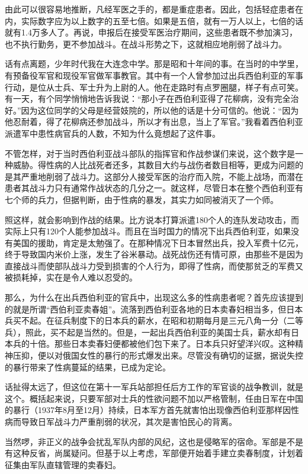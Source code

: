 \documentclass[12pt,UTF8]{ctexbook}
\begin{document}
由此可以很容易地推断，凡经军医之手的，都是重症患者。因此，包括轻症患者在内，实际数字应为以上数字的五至七倍。如果是五倍，就有一万人以上，七倍的话就有1.4万多人了。再说，申报后在接受军医治疗期间，这些患者既不参加演习，也不执行勤务，更不参加战斗。在战斗形势之下，这就相应地削弱了战斗力。

话有点离题，少年时代我在大连念中学。那是昭和十年间的事。在当时的中学里，有预备役军官和现役军官做军事教官。其中有一个人曾参加过出兵西伯利亚的军事行动，是位从士兵、军士升为上尉的人。他在走路时有点罗圈腿，样子有点可笑。有一天，有个同学悄悄地告诉我说：“那小子在西伯利亚得了花柳病，没有完全治好。”因为这位同学的父母是经营妓院的，所以他的话是十分可信的。他说：“因为他忍耐着，得了花柳病还参加战斗，所以才有出息，当上了军官。”我看着西伯利亚派遣军中患性病官兵的人数，不知为什么竟想起了这件事。

不管怎样，对于当时西伯利亚战斗部队的指挥官和作战参谋们来说，这个数字是一种威胁。得性病的人比战死者还多，其数目大约与战伤者数目相等，更成为问题的是其严重地削弱了战斗力。这部分人接受军医的治疗而入院，不能上战场，而潜在患者其战斗力只有通常作战状态的几分之一。就这样，尽管日本在整个西伯利亚有七个师的兵力，但据判断，由于性病的暴发，其实力如同被消灭了一个师。

照这样，就会影响到作战的结果。比方说本打算派遣180个人的连队发动攻击，而实际上只有120个人能参加战斗。而且在当时国力的情况下出兵西伯利亚，如果没有美国的援助，肯定是太勉强了。在那种情况下日本冒然出兵，投入军费十亿元，终于导致国内米价上涨，发生了谷米暴动。战死战伤还有情可原，由那些不是因为直接战斗而使部队战斗力受到损害的个人行为，即得了性病，而使那贫乏的军费又被损耗掉，实在是令人难以忍受的。

那么，为什么在出兵西伯利亚的官兵中，出现这么多的性病患者呢？首先应该提到的就是所谓“西伯利亚卖春姐”。流落到西伯利亚各地的日本卖春妇相当多，但日本兵买不起。在征兵制度下的日本兵的薪水，在昭和初期每月是三元八角一分（二等兵），照此，买不起是当然的。但是，一起出兵西伯利亚的美国士兵，薪水却有日本兵的十倍。那些日本卖春妇便都被他们包下来了。日本兵只好望洋兴叹。这种精神压抑，便以对俄国女性的暴行的形式爆发出来。尽管没有确切的证据，据说失控的暴行带来了性病蔓延的结果，已成为定论。

话扯得太远了，但这位在第十一军兵站部担任后方工作的军官谈的战争教训，就是这个。概括起来说，只要军部对士兵的性欲问题不加以严格管制，任由日军在中国的暴行（1937年8月至12月）持续，日本军方首先就害怕出现像西伯利亚那样因性病而导致日军战斗力严重削弱的状况，其次是害怕民心的背离。

当然啰，非正义的战争会扰乱军队内部的风纪，这也是侵略军的宿命。军部是不是有这种反省，尚属疑问。但基于以上考虑，军部便开始着手建立卖春制度，计划着征集由军队直辖管理的卖春妇。
\end{document}
